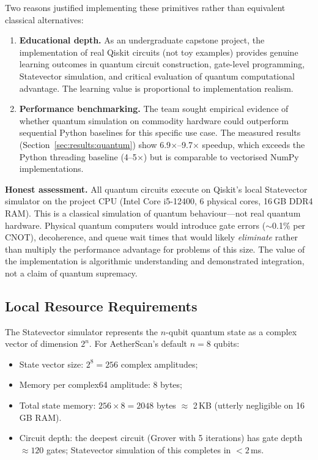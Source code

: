 \documentclass[12pt,a4paper]{article}
\begin{document}
Two reasons justified implementing these primitives rather than equivalent
classical alternatives:

\begin{enumerate}[leftmargin=*]
\item \textbf{Educational depth.} As an undergraduate capstone project, the
      implementation of real Qiskit circuits (not toy examples) provides
      genuine learning outcomes in quantum circuit construction, gate-level
      programming, Statevector simulation, and critical evaluation of
      quantum computational advantage. The learning value is proportional to
      implementation realism.
\item \textbf{Performance benchmarking.} The team sought empirical evidence
      of whether quantum simulation on commodity hardware could outperform
      sequential Python baselines for this specific use case. The measured
      results (Section~\ref{sec:results:quantum}) show 6.9$\times$--9.7$\times$
      speedup, which exceeds the Python threading baseline (4--5$\times$) but
      is comparable to vectorised NumPy implementations.
\end{enumerate}

\noindent\textbf{Honest assessment.}
All quantum circuits execute on Qiskit's local Statevector simulator on the
project CPU (Intel Core i5-12400, 6 physical cores, 16\,GB DDR4 RAM). This is
a classical simulation of quantum behaviour---not real quantum hardware.
Physical quantum computers would introduce gate errors ($\sim$0.1\% per CNOT),
decoherence, and queue wait times that would likely \emph{eliminate} rather
than multiply the performance advantage for problems of this size. The value of
the implementation is algorithmic understanding and demonstrated integration,
not a claim of quantum supremacy.

\subsection{Local Resource Requirements}
\label{sec:quantum:resources}

The Statevector simulator represents the $n$-qubit quantum state as a complex
vector of dimension $2^n$. For AetherScan's default $n = 8$ qubits:
\begin{itemize}[leftmargin=*]
\item State vector size: $2^8 = 256$ complex amplitudes;
\item Memory per complex64 amplitude: 8 bytes;
\item Total state memory: $256 \times 8 = 2048$ bytes $\approx$ 2\,KB
      (utterly negligible on 16\,GB RAM).
\item Circuit depth: the deepest circuit (Grover with 5 iterations) has
      gate depth $\approx 120$ gates; Statevector simulation of this completes
      in $< 2$\,ms.
\end{itemize}
\end{document}
